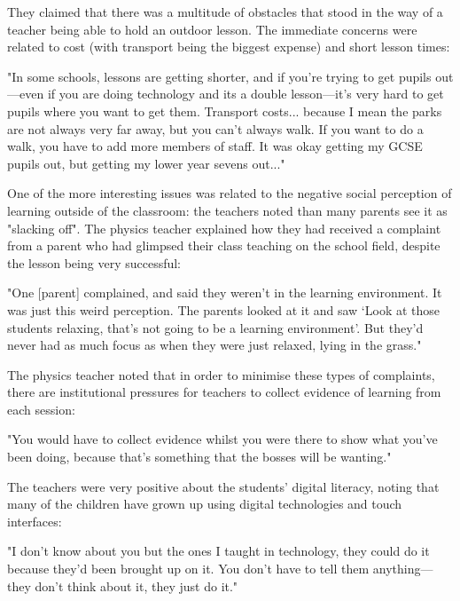 They claimed that there was a multitude of obstacles that stood in the way of a teacher being able to hold an outdoor lesson. The immediate concerns were related to cost (with transport being the biggest expense) and short lesson times:

\begin{displayquote}
 "In some schools, lessons are getting shorter, and if you're trying to get pupils out---even if you are doing technology and its a double lesson---it's very hard to get pupils where you want to get them.  Transport costs... because I mean the parks are not always very far away, but you can't always walk. If you want to do a walk, you have to add more members of staff. It was okay getting my GCSE pupils out, but getting my lower year sevens out..."
\end{displayquote}

One of the more interesting issues was related to the negative social perception of learning outside of the classroom: the teachers noted than many parents see it as "slacking off". The physics teacher explained how they had received a complaint from a parent who had glimpsed their class teaching on the school field, despite the lesson being very successful:

\begin{displayquote}
"One [parent] complained, and said they weren't in the learning environment. It was just this weird perception. The parents looked at it and saw ‘Look at those students relaxing, that’s not going to be a
learning environment’. But they'd never had as much focus as when they were just relaxed, lying in the grass."
\end{displayquote}

The physics teacher noted that in order to minimise these types of complaints, there are institutional pressures for teachers to collect evidence of learning from each session:

\begin{displayquote}
"You would have to collect evidence whilst you were there to show what you've been doing, because that's something that the bosses will be wanting."
\end{displayquote}

The teachers were very positive about the students' digital literacy, noting that many of the children have grown up using digital technologies and touch interfaces:

\begin{displayquote}
"I don't know about you but the ones I taught in technology, they could do it because they'd been brought up on it. You don't have to tell them anything---they don't think about it, they just do it."
\end{displayquote}

